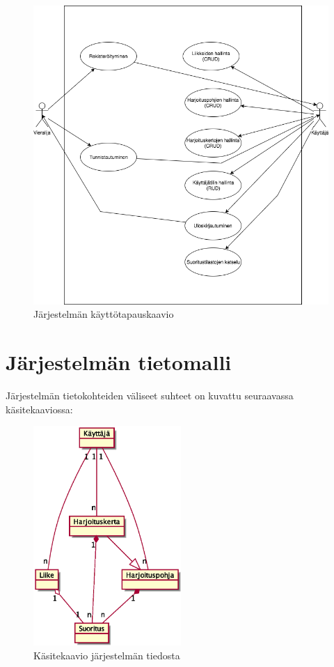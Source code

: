 \documentclass{article}
\begin{document}
\begin{figure}
  \includegraphics[width=\textwidth]{kayttotapauskaavio.png}
  \caption{Järjestelmän käyttötapauskaavio}
  \label{fig:usecases}
\end{figure}
\pagebreak
\section{Järjestelmän tietomalli}
Järjestelmän tietokohteiden väliseet suhteet on kuvattu seuraavassa käsitekaaviossa:
\begin{figure}[h]
  \centering
  \includegraphics[width=0.5\textwidth]{tietomalli.eps}
  \caption{Käsitekaavio järjestelmän tiedosta}
\end{figure}
\\
\end{document}
